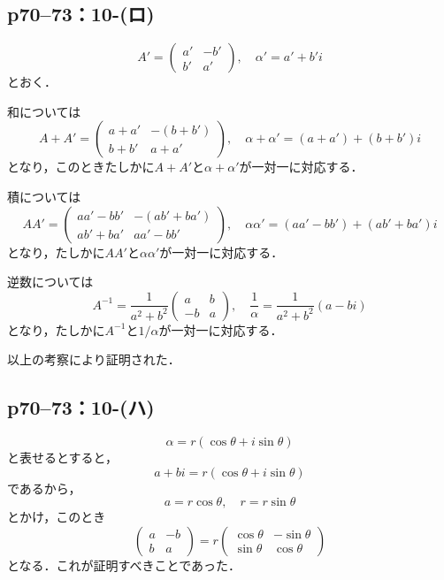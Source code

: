 \subsection*{p70--73：10-(ロ)}

\begin{tproof}
  \[
    A' = \begin{pmatrix} a' & -b' \\ b' & a' \end{pmatrix} , \quad \alpha ' = a' + b' i
  \]
  とおく．

  和については
  \[
    A+A' = \begin{pmatrix} a+a' & -(b+b') \\ b+b' & a+a' \end{pmatrix} , \quad \alpha + \alpha ' = (a+a') + (b+b') i
  \]
  となり，このときたしかに$A+A'$と$\alpha + \alpha '$が一対一に対応する．

  積については
  \[
    A A' = \begin{pmatrix} a a' - b b' & - (a b' + b a') \\ a b' + b a' & a a' - b b' \end{pmatrix} , \quad \alpha \alpha ' = (a a' - b b') + (a b' + b a') i
  \]
  となり，たしかに$AA'$と$\alpha \alpha '$が一対一に対応する．

  逆数については
  \[
    A^{-1} = \frac{1}{a^2+b^2} \begin{pmatrix} a & b \\ -b & a \end{pmatrix},\quad \frac{1}{\alpha} = \frac{1}{a^2+b^2}(a -bi )
  \]
  となり，たしかに$A^{-1}$と$1/\alpha$が一対一に対応する．

  以上の考察により証明された．
\end{tproof}




\subsection*{p70--73：10-(ハ)}

\begin{tproof}
  \[
    \alpha = r (\cos \theta + i \sin \theta)
  \]
  と表せるとすると，
  \[
    a+bi = r (\cos \theta + i \sin \theta )
  \]
  であるから，
  \[
    a= r \cos \theta , \quad r = r \sin \theta
  \]
  とかけ，このとき
  \[
    \begin{pmatrix} a & -b \\ b & a \end{pmatrix} = r \begin{pmatrix} \cos \theta & -\sin \theta \\ \sin \theta & \cos \theta \end{pmatrix}
  \]
  となる．これが証明すべきことであった．
\end{tproof}



